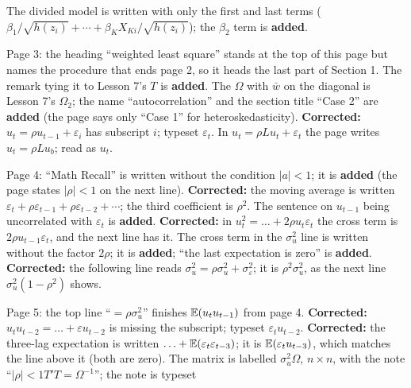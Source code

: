 \documentclass[11pt]{article}
\begin{document}
\begin{transcriptnotes}
        The divided model is written with only the first and last terms
        ($\beta_{1}/\sqrt{h(z_{i})} + \cdots + \beta_{K}X_{Ki}/\sqrt{h(z_{i})}$); the
        $\beta_{2}$ term is \textbf{added}.
  \item Page 3: the heading ``weighted least square'' stands at the top of this page
        but names the procedure that ends page 2, so it heads the last part of
        Section 1. The remark tying it to Lesson 7's $T$ is \textbf{added}. The
        $\Omega$ with $\bar w$ on the diagonal is Lesson 7's $\Omega_{2}$; the name
        ``autocorrelation'' and the section title ``Case 2'' are \textbf{added} (the
        page says only ``Case 1'' for heteroskedasticity). \textbf{Corrected:}
        $u_{t} = \rho u_{t-1} + \varepsilon_{i}$ has subscript $i$; typeset
        $\varepsilon_{t}$. In $u_{t} = \rho Lu_{t} + \varepsilon_{t}$ the page writes
        $u_{t} = \rho Lu_{b}$; read as $u_{t}$.
  \item Page 4: ``Math Recall'' is written without the condition $|a|<1$; it is
        \textbf{added} (the page states $|\rho| < 1$ on the next line).
        \textbf{Corrected:} the moving average is written
        $\varepsilon_{t} + \rho\varepsilon_{t-1} + \rho\varepsilon_{t-2} + \cdots$;
        the third coefficient is $\rho^{2}$. The sentence on $u_{t-1}$ being
        uncorrelated with $\varepsilon_{t}$ is \textbf{added}. \textbf{Corrected:} in
        $u_{t}^{2} = \ldots + 2\rho u_{t}\varepsilon_{t}$ the cross term is
        $2\rho u_{t-1}\varepsilon_{t}$, and the next line has it. The cross term in
        the $\sigma_{u}^{2}$ line is written without the factor $2\rho$; it is
        \textbf{added}; ``the last expectation is zero'' is \textbf{added}.
        \textbf{Corrected:} the following line reads $\sigma_{u}^{2} =
        \rho\sigma_{u}^{2} + \sigma_{\varepsilon}^{2}$; it is $\rho^{2}\sigma_{u}^{2}$,
        as the next line $\sigma_{u}^{2}(1-\rho^{2})$ shows.
  \item Page 5: the top line ``$= \rho\sigma_{u}^{2}$'' finishes $\mathbb{E}(u_{t}u_{t-1})$
        from page 4. \textbf{Corrected:} $u_{t}u_{t-2} = \ldots + \varepsilon u_{t-2}$
        is missing the subscript; typeset $\varepsilon_{t}u_{t-2}$.
        \textbf{Corrected:} the three-lag expectation is written
        $\ldots + \mathbb{E}(\varepsilon_{t}\varepsilon_{t-3})$; it is
        $\mathbb{E}(\varepsilon_{t}u_{t-3})$, which matches the line above it (both are zero).
        The matrix is labelled $\sigma_{u}^{2}\Omega$, $n\times n$, with the note
        ``$|\rho| < 1$\quad $T'T = \Omega^{-1}$''; the note is typeset

\end{transcriptnotes}
\end{document}
